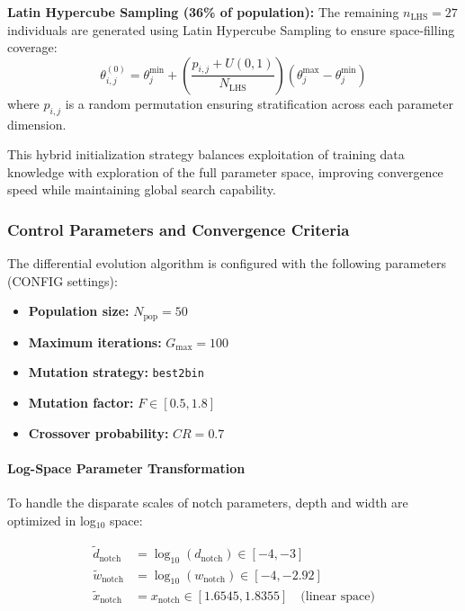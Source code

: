 \documentclass[12pt,a4paper]{report}
\begin{document}
\textbf{Latin Hypercube Sampling (36\% of population):} The remaining $n_{\text{LHS}} = 27$ individuals are generated using Latin Hypercube Sampling to ensure space-filling coverage:
\begin{equation}
\theta_{i,j}^{(0)} = \theta_{j}^{\text{min}} + \left( \frac{p_{i,j} + U(0,1)}{N_{\text{LHS}}} \right) \left( \theta_{j}^{\text{max}} - \theta_{j}^{\text{min}} \right)
\label{eq:lhs_sampling}
\end{equation}
where $p_{i,j}$ is a random permutation ensuring stratification across each parameter dimension.

This hybrid initialization strategy balances exploitation of training data knowledge with exploration of the full parameter space, improving convergence speed while maintaining global search capability.


\subsubsection{Control Parameters and Convergence Criteria}

The differential evolution algorithm is configured with the following parameters (CONFIG settings):

\begin{itemize}
    \item \textbf{Population size:} $N_{\text{pop}} = 50$ 
    \item \textbf{Maximum iterations:} $G_{\text{max}} = 100$ 
    \item \textbf{Mutation strategy:} \texttt{best2bin} 
    \item \textbf{Mutation factor:} $F \in [0.5, 1.8]$ 
    \item \textbf{Crossover probability:} $CR = 0.7$ 
\end{itemize}



\paragraph{Log-Space Parameter Transformation}
To handle the disparate scales of notch parameters, depth and width are optimized in log$_{10}$ space:

\begin{align}
\tilde{d}_{\text{notch}} &= \log_{10}(d_{\text{notch}}) \in [-4, -3] \\
\tilde{w}_{\text{notch}} &= \log_{10}(w_{\text{notch}}) \in [-4, -2.92] \\
\tilde{x}_{\text{notch}} &= x_{\text{notch}} \in [1.6545, 1.8355] \quad \text{(linear space)}
\end{align}
\end{document}
